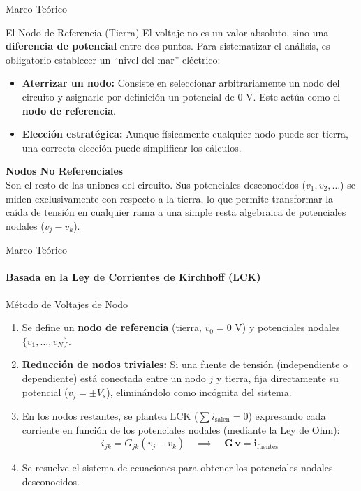 \documentclass[10pt, aspectratio=169]{beamer}
\begin{document}
\begin{frame}{Marco Teórico}
    \begin{boxTeoria}{El Nodo de Referencia (Tierra)}
        El voltaje no es un valor absoluto, sino una \textbf{diferencia de potencial} entre dos puntos. Para sistematizar el análisis, es obligatorio establecer un ``nivel del mar'' eléctrico:
        \begin{itemize}
            \item \textbf{Aterrizar un nodo:} Consiste en seleccionar arbitrariamente un nodo del circuito y asignarle por definición un potencial de $0\text{ V}$. Este actúa como el \textbf{nodo de referencia}.
            \item \textbf{Elección estratégica:} Aunque físicamente cualquier nodo puede ser tierra, una correcta elección puede simplificar los cálculos.
        \end{itemize}

        \vspace{0.2cm}
        \textbf{Nodos No Referenciales} \\
        Son el resto de las uniones del circuito. Sus potenciales desconocidos ($v_1, v_2, \dots$) se miden exclusivamente con respecto a la tierra, lo que permite transformar la caída de tensión en cualquier rama a una simple resta algebraica de potenciales nodales ($v_j - v_k$).
    \end{boxTeoria}
\end{frame}

\begin{frame}{Marco Teórico}
    \framesubtitle{Basada en la \textbf{Ley de Corrientes de Kirchhoff (LCK)}}
    \begin{boxTeoria}{Método de Voltajes de Nodo}
        \begin{enumerate}
            \item Se define un \textbf{nodo de referencia} (tierra, $v_0 = 0\text{ V}$) y potenciales nodales $\{v_1, \dots, v_N\}$.
            \item \textbf{Reducción de nodos triviales:} Si una fuente de tensión (independiente o dependiente) está conectada entre un nodo $j$ y tierra, fija directamente su potencial ($v_j = \pm V_s$), eliminándolo como incógnita del sistema.
            \item En los nodos restantes, se plantea LCK ($\sum i_{\text{salen}} = 0$) expresando cada corriente en función de los potenciales nodales (mediante la Ley de Ohm):
                  \begin{equation*}
                      i_{jk} = G_{jk}(v_j - v_k) \quad \implies \quad \mathbf{G}\,\mathbf{v} = \mathbf{i}_{\text{fuentes}}
                  \end{equation*}
            \item Se resuelve el sistema de ecuaciones para obtener los potenciales nodales desconocidos.
        \end{enumerate}
    \end{boxTeoria}
\end{frame}
\end{document}
